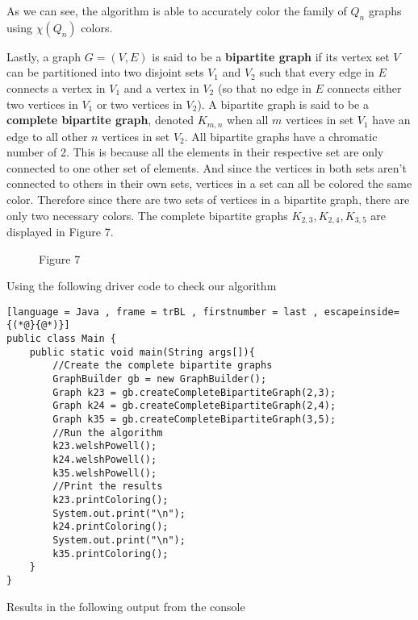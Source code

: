\documentclass[12pt, letterpaper]{article}
\begin{document}
As we can see, the algorithm is able to accurately color the family of $Q_n$ graphs using $\chi(Q_n)$ colors.


Lastly, a graph $G=(V,E)$ is said to be a \textbf{bipartite graph} if its vertex set $V$ can be partitioned into two disjoint sets $V_1$ and $V_2$ such that every edge in $E$ connects a vertex 	in $V_1$ and a vertex in $V_2$ (so that no edge in $E$ connects either two vertices in $V_1$ or two vertices in $V_2$). A bipartite graph is said to be a \textbf{complete bipartite graph}, denoted $K_{m,n}$ when all $m$ vertices in set $V_1$ have an edge to all other $n$ vertices in set $V_2$. All bipartite graphs have a chromatic number of 2. This is because all the elements in their respective set are only connected to one other set of elements. And since the vertices in both sets aren't connected to others in their own sets, vertices in a set can all be colored the same color. Therefore since there are two sets of vertices in a bipartite graph, there are only two necessary colors. The complete bipartite graphs $K_{2,3},K_{2,4},K_{3,5}$ are displayed in Figure 7.


\begin{figure}[h!]%
\begin{center}
	\qquad
	\qquad
	\caption*{Figure 7}
\end{center}
\end{figure}


Using the following driver code to check our algorithm


\begin{lstlisting}[language = Java , frame = trBL , firstnumber = last , escapeinside={(*@}{@*)}]
public class Main {
    public static void main(String args[]){
        //Create the complete bipartite graphs
        GraphBuilder gb = new GraphBuilder();
        Graph k23 = gb.createCompleteBipartiteGraph(2,3);
        Graph k24 = gb.createCompleteBipartiteGraph(2,4);
        Graph k35 = gb.createCompleteBipartiteGraph(3,5);
        //Run the algorithm
        k23.welshPowell();
        k24.welshPowell();
        k35.welshPowell();
        //Print the results
        k23.printColoring();
        System.out.print("\n");
        k24.printColoring();
        System.out.print("\n");
        k35.printColoring();
    }
}
\end{lstlisting}


Results in the following output from the console
\end{document}
